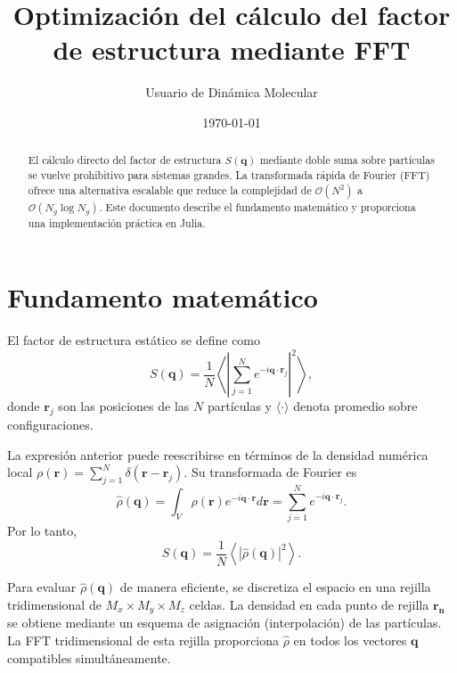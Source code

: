 \documentclass[justified, notoc]{tufte-handout}
\title{Optimización del cálculo del factor de estructura mediante FFT}
\author{Usuario de Dinámica Molecular}
\date{\today}
\begin{document}
\maketitle

\begin{abstract}
El cálculo directo del factor de estructura $S(\mathbf{q})$ mediante doble suma sobre partículas se vuelve prohibitivo para sistemas grandes. La transformada rápida de Fourier (FFT) ofrece una alternativa escalable que reduce la complejidad de $\mathcal{O}(N^2)$ a $\mathcal{O}(N_g \log N_g)$. Este documento describe el fundamento matemático y proporciona una implementación práctica en Julia.
\end{abstract}

\section{Fundamento matemático}\label{sec:teoria}

El factor de estructura estático se define como
\begin{equation}
S(\mathbf{q}) = \frac{1}{N} \left\langle \left| \sum_{j=1}^{N} e^{-i\mathbf{q}\cdot\mathbf{r}_j} \right|^2 \right\rangle,
\end{equation}
donde $\mathbf{r}_j$ son las posiciones de las $N$ partículas y $\langle \cdot \rangle$ denota promedio sobre configuraciones. 

La expresión anterior puede reescribirse en términos de la densidad numérica local $\rho(\mathbf{r}) = \sum_{j=1}^N \delta(\mathbf{r} - \mathbf{r}_j)$.
Su transformada de Fourier es
\begin{equation}
\hat{\rho}(\mathbf{q}) = \int_V \rho(\mathbf{r}) e^{-i\mathbf{q}\cdot\mathbf{r}} d\mathbf{r} = \sum_{j=1}^N e^{-i\mathbf{q}\cdot\mathbf{r}_j}.
\end{equation}
Por lo tanto,
\begin{equation}
S(\mathbf{q}) = \frac{1}{N} \left\langle |\hat{\rho}(\mathbf{q})|^2 \right\rangle.
\end{equation}

Para evaluar $\hat{\rho}(\mathbf{q})$ de manera eficiente, se discretiza el espacio en una rejilla tridimensional de $M_x \times M_y \times M_z$ celdas. La densidad en cada punto de rejilla $\mathbf{r}_\mathbf{n}$ se obtiene mediante un esquema de asignación (interpolación) de las partículas. La FFT tridimensional de esta rejilla proporciona $\hat{\rho}$ en todos los vectores $\mathbf{q}$ compatibles simultáneamente.
\end{document}
